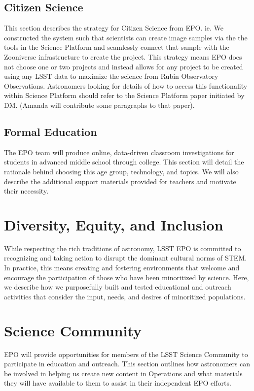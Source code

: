 \subsection{Citizen Science}\label{sec:citsci}
This section describes the strategy for Citizen Science from EPO.  ie. We constructed the system such that scientists can create image samples via the the tools in the Science Platform and seamlessly connect that sample with the Zooniverse infrastructure to create the project.  This strategy means EPO does not choose one or two projects and instead allows for any project to be created using any LSST data to maximize the science from Rubin Observatory Observations. 
Astronomers looking for details of how to access this functionality within Science Platform should refer to the Science Platform paper initiated by DM.  (Amanda will contribute some paragraphs to that paper).

\subsection{Formal Education}\label{sec:edu}
The EPO team will produce online, data-driven classroom investigations for students in advanced middle school through college. This section will detail the rationale behind choosing this age group, technology, and topics. We will also describe the additional support materials provided for teachers and motivate their necessity. 

\section{Diversity, Equity, and Inclusion}\label{sec:diversity}
While respecting the rich traditions of astronomy, LSST EPO is committed to recognizing and taking action to disrupt the dominant cultural norms of STEM. In practice, this means creating and fostering environments that welcome and encourage the participation of those who have been minoritized by science. Here, we describe how we purposefully built and tested educational and outreach activities that consider the input, needs, and desires of minoritized populations.

\section{Science Community}\label{sec:scicommunity}
EPO will provide opportunities for members of the LSST Science Community to participate in education and outreach. This section outlines how astronomers can be involved in helping us create new content in Operations and what materials they will have available to them to assist in their independent EPO efforts. 

